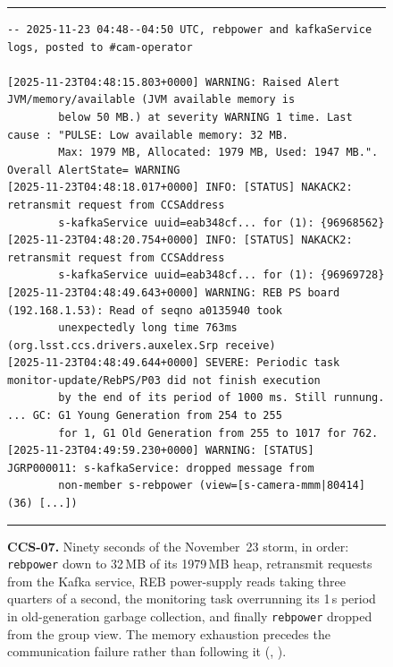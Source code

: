 \begin{description}
\begin{figure}[H]
\centering
\begin{minipage}{\textwidth}
\hrule\vspace{4pt}
\begingroup\scriptsize
\begin{verbatim}
-- 2025-11-23 04:48--04:50 UTC, rebpower and kafkaService logs, posted to #cam-operator

[2025-11-23T04:48:15.803+0000] WARNING: Raised Alert JVM/memory/available (JVM available memory is
        below 50 MB.) at severity WARNING 1 time. Last cause : "PULSE: Low available memory: 32 MB.
        Max: 1979 MB, Allocated: 1979 MB, Used: 1947 MB.". Overall AlertState= WARNING
[2025-11-23T04:48:18.017+0000] INFO: [STATUS] NAKACK2: retransmit request from CCSAddress
        s-kafkaService uuid=eab348cf... for (1): {96968562}
[2025-11-23T04:48:20.754+0000] INFO: [STATUS] NAKACK2: retransmit request from CCSAddress
        s-kafkaService uuid=eab348cf... for (1): {96969728}
[2025-11-23T04:48:49.643+0000] WARNING: REB PS board (192.168.1.53): Read of seqno a0135940 took
        unexpectedly long time 763ms (org.lsst.ccs.drivers.auxelex.Srp receive)
[2025-11-23T04:48:49.644+0000] SEVERE: Periodic task monitor-update/RebPS/P03 did not finish execution
        by the end of its period of 1000 ms. Still runnung. ... GC: G1 Young Generation from 254 to 255
        for 1, G1 Old Generation from 255 to 1017 for 762.
[2025-11-23T04:49:59.230+0000] WARNING: [STATUS] JGRP000011: s-kafkaService: dropped message from
        non-member s-rebpower (view=[s-camera-mmm|80414] (36) [...])
\end{verbatim}
\endgroup
\vspace{-10pt}\hrule
\end{minipage}
\caption{\textbf{CCS-07.} Ninety seconds of the November~23 storm, in order: \texttt{rebpower} down to 32\,MB of its 1979\,MB heap, retransmit requests from the Kafka service, REB power-supply reads taking three quarters of a second, the monitoring task overrunning its 1\,s period in old-generation garbage collection, and finally \texttt{rebpower} dropped from the group view.  The memory exhaustion precedes the communication failure rather than following it (, ).}
\label{fig:iss-CCS-07}
\end{figure}


\end{description}
